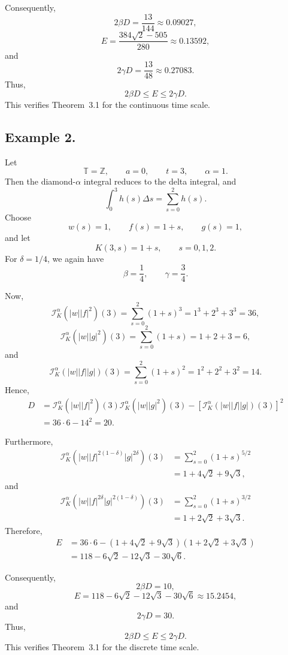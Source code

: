 \documentclass[11pt]{article}
\begin{document}
Consequently,
\[
    2\beta D=\frac{13}{144}\approx 0.09027,
\]
\[
    E=\frac{384\sqrt{2}-505}{280}\approx 0.13592,
\]
and
\[
    2\gamma D=\frac{13}{48}\approx 0.27083.
\]
Thus,
\[
    2\beta D\leq E\leq 2\gamma D.
\]
This verifies Theorem~3.1 for the continuous time scale.

\subsection{Example 2.}

Let
\[
    \mathbb{T}=\mathbb{Z}, \qquad a=0, \qquad t=3, \qquad \alpha=1.
\]
Then the diamond-$\alpha$ integral reduces to the delta integral, and
\[
    \int_0^3 h(s)\Delta s=\sum_{s=0}^{2}h(s).
\]
Choose
\[
    w(s)=1, \qquad f(s)=1+s, \qquad g(s)=1,
\]
and let
\[
    K(3,s)=1+s, \qquad s=0,1,2.
\]
For $\delta=1/4$, we again have
\[
    \beta=\frac14, \qquad \gamma=\frac34.
\]

Now,
\[
\mathcal{I}_{K}^{\alpha}(|w||f|^2)(3)
=
\sum_{s=0}^{2}(1+s)^3
=
1^3+2^3+3^3
=
36,
\]
\[
\mathcal{I}_{K}^{\alpha}(|w||g|^2)(3)
=
\sum_{s=0}^{2}(1+s)
=
1+2+3
=
6,
\]
and
\[
\mathcal{I}_{K}^{\alpha}(|w||f||g|)(3)
=
\sum_{s=0}^{2}(1+s)^2
=
1^2+2^2+3^2
=
14.
\]
Hence,
\[
\begin{aligned}
D
&=
\mathcal{I}_{K}^{\alpha}(|w||f|^2)(3)
\mathcal{I}_{K}^{\alpha}(|w||g|^2)(3)
-
\left[
\mathcal{I}_{K}^{\alpha}(|w||f||g|)(3)
\right]^2  \\
&=
36\cdot 6-14^2
=
20.
\end{aligned}
\]

Furthermore,
\[
\begin{aligned}
\mathcal{I}_{K}^{\alpha}
\left(|w||f|^{2(1-\delta)}|g|^{2\delta}\right)(3)
&=
\sum_{s=0}^{2}(1+s)^{5/2} \\
&=
1+4\sqrt{2}+9\sqrt{3},
\end{aligned}
\]
and
\[
\begin{aligned}
\mathcal{I}_{K}^{\alpha}
\left(|w||f|^{2\delta}|g|^{2(1-\delta)}\right)(3)
&=
\sum_{s=0}^{2}(1+s)^{3/2} \\
&=
1+2\sqrt{2}+3\sqrt{3}.
\end{aligned}
\]
Therefore,
\[
\begin{aligned}
E
&=
36\cdot 6
-
(1+4\sqrt{2}+9\sqrt{3})(1+2\sqrt{2}+3\sqrt{3}) \\
&=
118-6\sqrt{2}-12\sqrt{3}-30\sqrt{6}.
\end{aligned}
\]

Consequently,
\[
    2\beta D=10,
\]
\[
    E=118-6\sqrt{2}-12\sqrt{3}-30\sqrt{6}
    \approx 15.2454,
\]
and
\[
    2\gamma D=30.
\]
Thus,
\[
    2\beta D\leq E\leq 2\gamma D.
\]
This verifies Theorem~3.1 for the discrete time scale.
\end{document}
